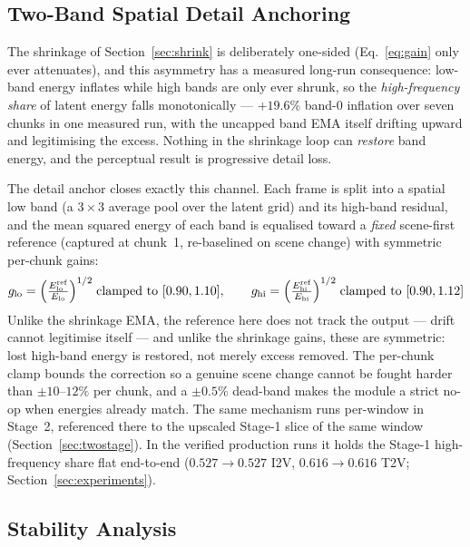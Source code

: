 \documentclass[12pt]{article}
\begin{document}
\subsection{Two-Band Spatial Detail Anchoring}
\label{sec:detail}

The shrinkage of Section~\ref{sec:shrink} is deliberately one-sided
(Eq.~\eqref{eq:gain} only ever attenuates), and this asymmetry has a measured
long-run consequence: low-band energy inflates while high bands are only ever
shrunk, so the \emph{high-frequency share} of latent energy falls monotonically
--- $+19.6\%$ band-0 inflation over seven chunks in one measured run, with the
uncapped band EMA itself drifting upward and legitimising the excess.  Nothing
in the shrinkage loop can \emph{restore} band energy, and the perceptual result
is progressive detail loss.

The detail anchor closes exactly this channel.  Each frame is split into a
spatial low band (a $3\times3$ average pool over the latent grid) and its
high-band residual, and the mean squared energy of each band is equalised
toward a \emph{fixed} scene-first reference (captured at chunk~1, re-baselined
on scene change) with symmetric per-chunk gains:
\begin{equation}
g_{\rm lo} = \Big(\tfrac{E_{\rm lo}^{\rm ref}}{E_{\rm lo}}\Big)^{1/2}
\;\text{clamped to } [0.90, 1.10], \qquad
g_{\rm hi} = \Big(\tfrac{E_{\rm hi}^{\rm ref}}{E_{\rm hi}}\Big)^{1/2}
\;\text{clamped to } [0.90, 1.12]
\label{eq:detail}
\end{equation}
Unlike the shrinkage EMA, the reference here does not track the output ---
drift cannot legitimise itself --- and unlike the shrinkage gains, these are
symmetric: lost high-band energy is restored, not merely excess removed.  The
per-chunk clamp bounds the correction so a genuine scene change cannot be
fought harder than $\pm10$--$12\%$ per chunk, and a $\pm0.5\%$ dead-band makes
the module a strict no-op when energies already match.  The same mechanism runs
per-window in Stage~2, referenced there to the upscaled Stage-1 slice of the
same window (Section~\ref{sec:twostage}).  In the verified production runs it
holds the Stage-1 high-frequency share flat end-to-end ($0.527\to0.527$ I2V,
$0.616\to0.616$ T2V; Section~\ref{sec:experiments}).

\subsection{Stability Analysis}
\label{sec:stability}
\end{document}
